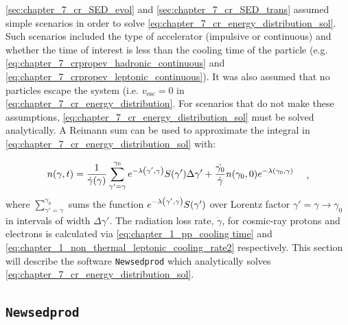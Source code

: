 \autoref{sec:chapter_7_cr_SED_evol} and \autoref{sec:chapter_7_cr_SED_trans} assumed simple scenarios in order to solve \autoref{eq:chapter_7_cr_energy_distribution_sol}. Such scenarios included the type of accelerator (impulsive or continuous) and whether the time of interest is less than the cooling time of the particle (e.g. \autoref{eq:chapter_7_crpropev_hadronic_continuous} and \autoref{eq:chapter_7_crpropev_leptonic_continuous}). It was also assumed that no particles escape the system (i.e. $v_\text{esc}=0$ in \autoref{eq:chapter_7_cr_energy_distribution}. For scenarios that do not make these assumptions, \autoref{eq:chapter_7_cr_energy_distribution_sol} must be solved analytically. A Reimann sum can be used to approximate the integral in \autoref{eq:chapter_7_cr_energy_distribution_sol} with:

\begin{equation}
    \begin{aligned}
	    n\qty(\gamma,t)&=\frac{1}{\dot{\gamma}\qty(\gamma)}\sum_{\gamma'=\gamma}^{\gamma_0} 	e^{-\lambda\qty(\gamma',\gamma)}S\qty(\gamma')\Delta \gamma' + 	\frac{\dot{\gamma_0}}{\dot{\gamma}}n\qty(\gamma_0,0)e^{-\lambda\qty(\gamma_0,\gamma)} 
    \end{aligned} \label{eq:chapter_7_single_zone_numerical}\text{ ,}
\end{equation}
\noindent where $\sum_{\gamma'=\gamma}^{\gamma_0}$ sums the function $e^{-\lambda\qty(\gamma',\gamma)}S\qty(\gamma')$ over Lorentz factor $\gamma'=\gamma\rightarrow \gamma_0$ in intervals of width $\Delta \gamma'$. The radiation loss rate, $\dot{\gamma}$, for cosmic-ray protons and electrons is calculated via \autoref{eq:chapter_1_pp_cooling time} and \autoref{eq:chapter_1_non_thermal_leptonic_cooling_rate2} respectively. This section will describe the software {\tt Newsedprod} which analytically solves \autoref{eq:chapter_7_cr_energy_distribution_sol}.

\subsection{{\tt Newsedprod}} \label{sec_chapter_7_newsedprod}

